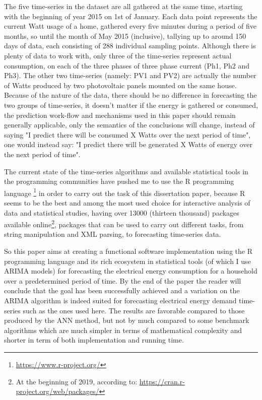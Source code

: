 \documentclass[12pt,a4paper,titlepage]{report}
\begin{document}
The five time-series in the dataset are all gathered at the same time, starting with the beginning of year 2015 on 1st of January. Each data point represents the current Watt usage of a home, gathered every five minutes during a period of five months, so until the month of May 2015 (inclusive), tallying up to around 150 days of data, each consisting of 288 individual sampling points. Although there is plenty of data to work with, only three of the time-series represent actual consumption, on each of the three phases of three phase current (Ph1, Ph2 and Ph3). The other two time-series (namely: PV1 and PV2) are actually the number of Watts produced by two photovoltaic panels mounted on the same house.
Because of the nature of the data, there should be no difference in forecasting the two groups of time-series, it doesn't matter if the energy is gathered or consumed, the prediction work-flow and mechanisms used in this paper should remain generally applicable, only the semantics of the conclusions will change, instead of saying "I predict there will be consumed X Watts over the next period of time", one would instead say: "I predict there will be generated X Watts of energy over the next period of time".

The current state of the time-series algorithms and available statistical tools in the programming communities have pushed me to use the R programming language \footnote{\url{https://www.r-project.org/}} in order to carry out the task of this dissertation paper, because R seems to be the best and among the most used \cite{Rdesign} choice for interactive analysis of data and statistical studies, having over 13000 (thirteen thousand) packages available online\footnote{At the beginning of 2019, according to: \url{https://cran.r-project.org/web/packages/}}, packages that can be used to carry out different tasks, from string manipulation and XML parsing, to forecasting time-series data.

So this paper aims at creating a functional software implementation using the R programming language and its rich ecosystem in statistical tools (of which I use ARIMA models) for forecasting the electrical energy consumption for a household over a predetermined period of time. By the end of the paper the reader will conclude that the goal has been successfully achieved and a variation on the ARIMA algorithm is indeed suited for forecasting electrical energy demand time-series such as the ones used here. The results are favorable compared to those produced by the ANN method, but not by much compared to some benchmark algorithms which are much simpler in terms of mathematical complexity and shorter in term of both implementation and running time.
\end{document}

